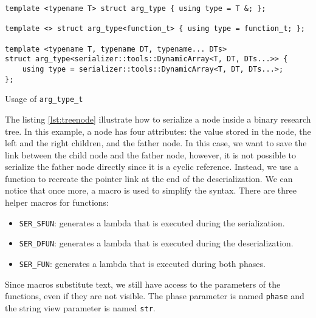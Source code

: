 \begin{listing}[ht!]
\begin{verbatim}
template <typename T> struct arg_type { using type = T &; };

template <> struct arg_type<function_t> { using type = function_t; };

template <typename T, typename DT, typename... DTs>
struct arg_type<serializer::tools::DynamicArray<T, DT, DTs...>> {
    using type = serializer::tools::DynamicArray<T, DT, DTs...>;
};
\end{verbatim}
\caption{Usage of \texttt{arg\_type\_t}}
\label{lst:mlargtype}
\end{listing}

The listing \ref{lst:treenode} illustrate how to serialize a node inside a
binary research tree. In this example, a node has four attributes: the value
stored in the node, the left and the right children, and the father node. In
this case, we want to save the link between the child node and the father node,
however, it is not possible to serialize the father node directly since it is a
cyclic reference. Instead, we use a function to recreate the pointer link at the
end of the deserialization. We can notice that once more, a macro is used to
simplify the syntax. There are three helper macros for functions:

\begin{itemize}
  \item \texttt{SER\_SFUN}: generates a lambda that is executed during the
    serialization.
  \item \texttt{SER\_DFUN}: generates a lambda that is executed during the
    deserialization.
  \item \texttt{SER\_FUN}: generates a lambda that is executed during both
    phases.
\end{itemize}

Since macros substitute text, we still have access to the parameters of the
functions, even if they are not visible. The phase parameter is named
\texttt{phase} and the string view parameter is named \texttt{str}.

